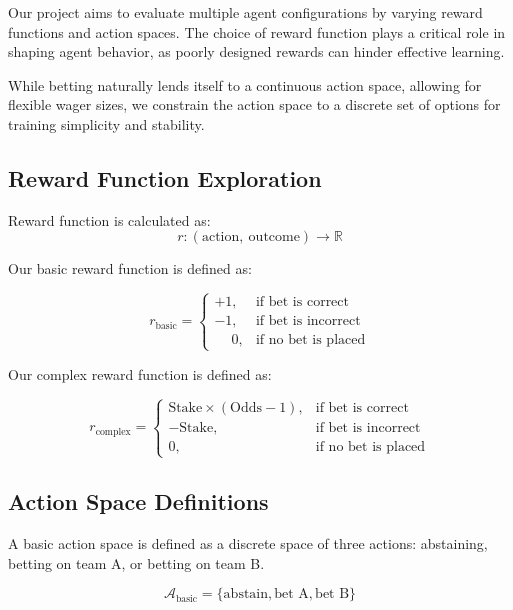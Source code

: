 \documentclass[sigconf]{acmart}
\begin{document}
Our project aims to evaluate multiple agent configurations by varying reward functions and action spaces. The choice of reward function plays a critical role in shaping agent behavior, as poorly designed rewards can hinder effective learning.

While betting naturally lends itself to a continuous action space, allowing for flexible wager sizes, we constrain the action space to a discrete set of options for training simplicity and stability.

\subsection{Reward Function Exploration}

Reward function is calculated as:
\[
r: (\text{action},\ \text{outcome}) \rightarrow \mathbb{R}
\]

Our basic reward function is defined as:

\begin{equation}
r_{\text{basic}} =
\begin{cases}
+1, & \text{if bet is correct} \\
-1, & \text{if bet is incorrect} \\
\phantom{+}0, & \text{if no bet is placed}
\end{cases}
\end{equation}

Our complex reward function is defined as:

\begin{equation}
r_{\text{complex}} =
\begin{cases}
\text{Stake} \times (\text{Odds} - 1), & \text{if bet is correct} \\
-\text{Stake}, & \text{if bet is incorrect} \\
\text{0}, & \text{if no bet is placed}
\end{cases}
\end{equation}

\subsection{Action Space Definitions}

A basic action space is defined as a discrete space of three actions: abstaining, betting on team A, or betting on team B.

\begin{equation}
\mathcal{A}_{\text{basic}} = \{\text{abstain}, \text{bet A}, \text{bet B} \}
\end{equation}
\end{document}
